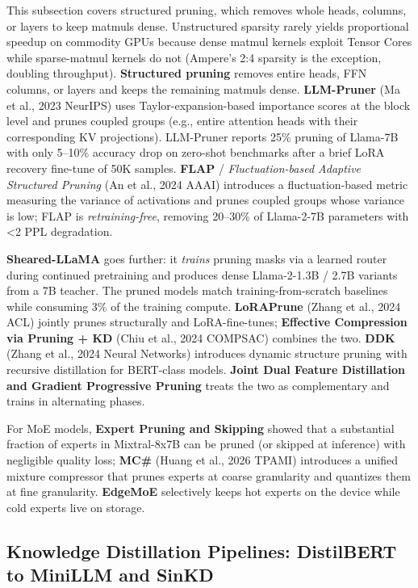 \documentclass{article}
\begin{document}
This subsection covers structured pruning, which removes whole heads, columns, or layers to keep matmuls dense. Unstructured sparsity rarely yields proportional speedup on commodity GPUs because dense matmul kernels exploit Tensor Cores while sparse-matmul kernels do not (Ampere's 2:4 sparsity is the exception, doubling throughput). \textbf{Structured pruning} removes entire heads, FFN columns, or layers and keeps the remaining matmuls dense. \textbf{LLM-Pruner} (Ma et al., 2023 NeurIPS) uses Taylor-expansion-based importance scores at the block level and prunes coupled groups (e.g., entire attention heads with their corresponding KV projections). LLM-Pruner reports 25\% pruning of Llama-7B with only 5--10\% accuracy drop on zero-shot benchmarks after a brief LoRA recovery fine-tune of 50K samples. \textbf{FLAP} / \emph{Fluctuation-based Adaptive Structured Pruning} (An et al., 2024 AAAI) introduces a fluctuation-based metric measuring the variance of activations and prunes coupled groups whose variance is low; FLAP is \emph{retraining-free}, removing 20--30\% of Llama-2-7B parameters with \textless2 PPL degradation.

\textbf{Sheared-LLaMA} \citep{xia20242024} goes further: it \emph{trains} pruning masks via a learned router during continued pretraining and produces dense Llama-2-1.3B / 2.7B variants from a 7B teacher. The pruned models match training-from-scratch baselines while consuming 3\% of the training compute. \textbf{LoRAPrune} (Zhang et al., 2024 ACL) jointly prunes structurally and LoRA-fine-tunes; \textbf{Effective Compression via Pruning + KD} (Chiu et al., 2024 COMPSAC) combines the two. \textbf{DDK} (Zhang et al., 2024 Neural Networks) introduces dynamic structure pruning with recursive distillation for BERT-class models. \textbf{Joint Dual Feature Distillation and Gradient Progressive Pruning} \citep{zhang20242024} treats the two as complementary and trains in alternating phases.

For MoE models, \textbf{Expert Pruning and Skipping} \citep{lu20242024} showed that a substantial fraction of experts in Mixtral-8x7B can be pruned (or skipped at inference) with negligible quality loss; \textbf{MC\#} (Huang et al., 2026 TPAMI) introduces a unified mixture compressor that prunes experts at coarse granularity and quantizes them at fine granularity. \textbf{EdgeMoE} \citep{yi20232023} selectively keeps hot experts on the device while cold experts live on storage.

\subsection{Knowledge Distillation Pipelines: DistilBERT to MiniLLM and SinKD}\label{knowledge-distillation-pipelines-distilbert-to-minillm-and-sinkd}
\end{document}

